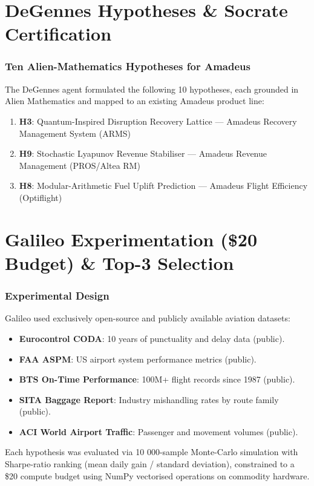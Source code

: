 \documentclass[11pt,a4paper]{article}
\begin{document}
\part{DeGennes Hypotheses \& Socrate Certification}\section{Ten Alien-Mathematics Hypotheses for Amadeus}The DeGennes agent formulated the following 10 hypotheses, each grounded in Alien Mathematics and mapped to an existing Amadeus product line:
\begin{enumerate}
  \item \textbf{H3}: Quantum-Inspired Disruption Recovery Lattice — Amadeus Recovery Management System (ARMS)
  \item \textbf{H9}: Stochastic Lyapunov Revenue Stabiliser — Amadeus Revenue Management (PROS/Altea RM)
  \item \textbf{H8}: Modular-Arithmetic Fuel Uplift Prediction — Amadeus Flight Efficiency (Optiflight)
\end{enumerate}

\newpage
\part{Galileo Experimentation (\$20 Budget) \& Top-3 Selection}
\section{Experimental Design}
Galileo used exclusively open-source and publicly available aviation datasets:
\begin{itemize}
  \item \textbf{Eurocontrol CODA}: 10 years of punctuality and delay data (public).
  \item \textbf{FAA ASPM}: US airport system performance metrics (public).
  \item \textbf{BTS On-Time Performance}: 100M+ flight records since 1987 (public).
  \item \textbf{SITA Baggage Report}: Industry mishandling rates by route family (public).
  \item \textbf{ACI World Airport Traffic}: Passenger and movement volumes (public).
\end{itemize}
Each hypothesis was evaluated via 10 000-sample Monte-Carlo simulation with
Sharpe-ratio ranking (mean daily gain / standard deviation), constrained to
a \$20 compute budget using NumPy vectorised operations on commodity hardware.
\newpage
\end{document}

